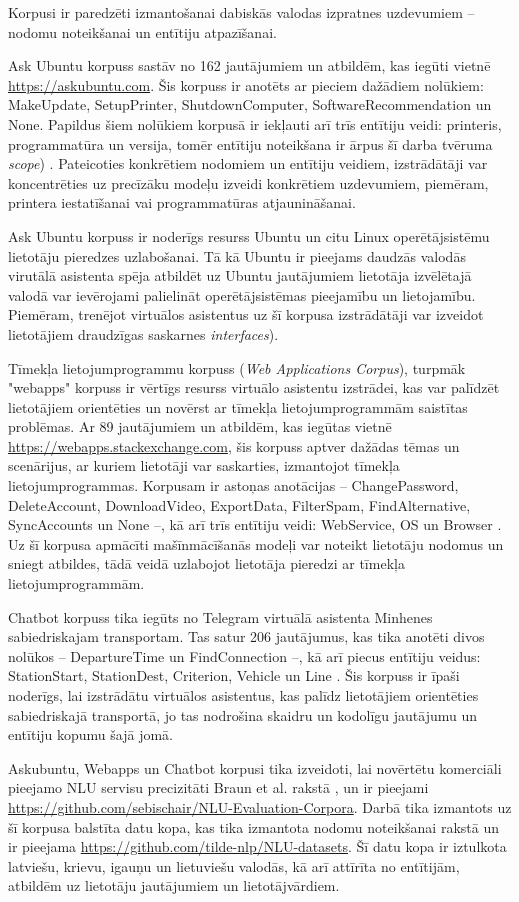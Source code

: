 Korpusi ir paredzēti izmantošanai dabiskās valodas izpratnes uzdevumiem -- nodomu noteikšanai un entītiju atpazīšanai.

Ask Ubuntu korpuss sastāv no 162 jautājumiem un atbildēm, kas iegūti vietnē \url{https://askubuntu.com}. Šis korpuss ir anotēts ar pieciem dažādiem nolūkiem: MakeUpdate, SetupPrinter, ShutdownComputer, SoftwareRecommendation un None. Papildus šiem nolūkiem korpusā ir iekļauti arī trīs entītiju veidi: printeris, programmatūra un versija, tomēr entītiju noteikšana ir ārpus šī darba tvēruma \textit{scope}) \cite{braun-2017}. Pateicoties konkrētiem nodomiem un entītiju veidiem, izstrādātāji var koncentrēties uz precīzāku modeļu izveidi konkrētiem uzdevumiem, piemēram, printera iestatīšanai vai programmatūras atjaunināšanai.

Ask Ubuntu korpuss ir noderīgs resurss Ubuntu un citu Linux operētājsistēmu lietotāju pieredzes uzlabošanai. Tā kā Ubuntu ir pieejams daudzās valodās virutālā asistenta spēja atbildēt uz Ubuntu jautājumiem lietotāja izvēlētajā valodā var ievērojami palielināt operētājsistēmas pieejamību un lietojamību. Piemēram, trenējot virtuālos asistentus uz šī korpusa izstrādātāji var izveidot lietotājiem draudzīgas saskarnes \textit{interfaces}). 


Tīmekļa lietojumprogrammu korpuss (\textit{Web Applications Corpus}), turpmāk "webapps" korpuss ir vērtīgs resurss virtuālo asistentu izstrādei, kas var palīdzēt lietotājiem orientēties un novērst ar tīmekļa lietojumprogrammām saistītas problēmas. Ar 89 jautājumiem un atbildēm, kas iegūtas vietnē \url{https://webapps.stackexchange.com}, šis korpuss aptver dažādas tēmas un scenārijus, ar kuriem lietotāji var saskarties, izmantojot tīmekļa lietojumprogrammas. Korpusam ir astoņas anotācijas -- ChangePassword, DeleteAccount, DownloadVideo, ExportData, FilterSpam, FindAlternative, SyncAccounts un None --, kā arī trīs entītiju veidi: WebService, OS un Browser \cite{braun-2017}. Uz šī korpusa apmācīti mašīnmācīšanās modeļi var noteikt lietotāju nodomus un sniegt atbildes, tādā veidā uzlabojot lietotāja pieredzi ar tīmekļa lietojumprogrammām.

Chatbot korpuss tika iegūts no Telegram virtuālā asistenta Minhenes sabiedriskajam transportam. Tas satur 206 jautājumus, kas tika anotēti divos nolūkos -- DepartureTime un FindConnection --, kā arī piecus entītiju veidus: StationStart, StationDest, Criterion, Vehicle un Line \cite{braun-2017}. Šis korpuss ir īpaši noderīgs, lai izstrādātu virtuālos asistentus, kas palīdz lietotājiem orientēties sabiedriskajā transportā, jo tas nodrošina skaidru un kodolīgu jautājumu un entītiju kopumu šajā jomā. 

Askubuntu, Webapps un Chatbot korpusi tika izveidoti, lai novērtētu komerciāli pieejamo NLU servisu precizitāti Braun et al. rakstā \cite{braun-2017}, un ir pieejami \url{https://github.com/sebischair/NLU-Evaluation-Corpora}. Darbā tika izmantots uz šī korpusa balstīta datu kopa, kas tika izmantota nodomu noteikšanai \cite{fasttext2019} rakstā un ir pieejama \url{https://github.com/tilde-nlp/NLU-datasets}. Šī datu kopa ir iztulkota latviešu, krievu, igauņu un lietuviešu valodās, kā arī attīrīta no entītijām, atbildēm uz lietotāju jautājumiem un lietotājvārdiem.